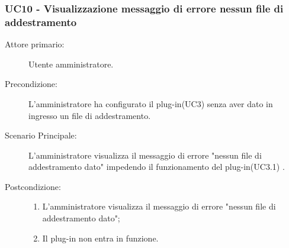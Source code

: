 \subsubsection{UC10 - Visualizzazione messaggio di errore nessun file di addestramento}
\label{sssec:uc10}
\begin{description}
	\item[Attore primario:] Utente amministratore.
	\item[Precondizione:] L'amministratore ha configurato il plug-in(UC3) senza aver dato in ingresso un file di addestramento.
	\item[Scenario Principale:] L'amministratore visualizza il messaggio di errore "nessun file di addestramento dato" impedendo il funzionamento del plug-in(UC3.1) .
	\item[Postcondizione:]
	\begin{enumerate}
		\item L'amministratore visualizza il messaggio di errore "nessun file di addestramento dato";
		\item Il plug-in non entra in funzione.
	\end{enumerate}
\end{description}
